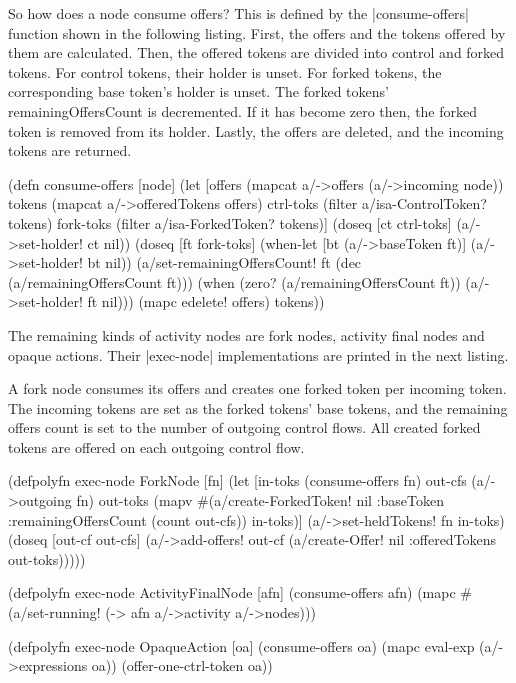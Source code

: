\documentclass[submission]{eptcs}
\newcommand{\code}{\clojureinline}
\begin{document}
So how does a node consume offers?  This is defined by the
\code|consume-offers| function shown in the following listing.  First, the
offers and the tokens offered by them are calculated.  Then, the offered tokens
are divided into control and forked tokens.  For control tokens, their holder
is unset.  For forked tokens, the corresponding base token's holder is unset.
The forked tokens' \textsf{remainingOffersCount} is decremented.  If it has
become zero then, the forked token is removed from its holder.  Lastly, the
offers are deleted, and the incoming tokens are returned.

\begin{clojurecode}
(defn consume-offers [node]
  (let [offers    (mapcat a/->offers (a/->incoming node))
        tokens    (mapcat a/->offeredTokens offers)
        ctrl-toks (filter a/isa-ControlToken? tokens)
        fork-toks (filter a/isa-ForkedToken? tokens)]
    (doseq [ct ctrl-toks]
      (a/->set-holder! ct nil))
    (doseq [ft fork-toks]
      (when-let [bt (a/->baseToken ft)]
        (a/->set-holder! bt nil))
      (a/set-remainingOffersCount! ft (dec (a/remainingOffersCount ft)))
      (when (zero? (a/remainingOffersCount ft))
        (a/->set-holder! ft nil)))
    (mapc edelete! offers)
    tokens))
\end{clojurecode}

The remaining kinds of activity nodes are fork nodes, activity final nodes and
opaque actions.  Their \code|exec-node| implementations are printed in the next
listing.

A fork node consumes its offers and creates one forked token per incoming
token.  The incoming tokens are set as the forked tokens' base tokens, and the
remaining offers count is set to the number of outgoing control flows.  All
created forked tokens are offered on each outgoing control flow.

\begin{clojurecode}
(defpolyfn exec-node ForkNode [fn]
  (let [in-toks  (consume-offers fn)
        out-cfs  (a/->outgoing fn)
        out-toks (mapv #(a/create-ForkedToken!
                         nil {:baseToken %
                              :remainingOffersCount (count out-cfs)})
                       in-toks)]
    (a/->set-heldTokens! fn in-toks)
    (doseq [out-cf out-cfs]
      (a/->add-offers! out-cf (a/create-Offer!
                               nil {:offeredTokens out-toks})))))

(defpolyfn exec-node ActivityFinalNode [afn]
  (consume-offers afn)
  (mapc #(a/set-running! %
        (-> afn a/->activity a/->nodes)))

(defpolyfn exec-node OpaqueAction [oa]
  (consume-offers oa)
  (mapc eval-exp (a/->expressions oa))
  (offer-one-ctrl-token oa))
\end{clojurecode}
\end{document}
